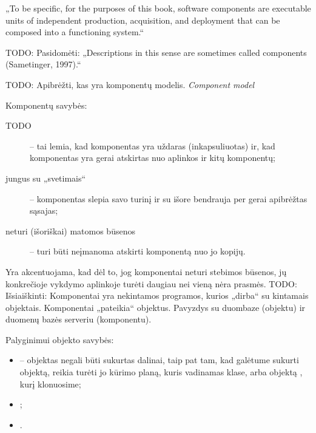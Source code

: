 „To be specific, for the purposes of this book, software components
are executable units of independent production, acquisition, and deployment
that can be composed into a functioning system.“ 
\cite[3]{cs-beyond-object-oriented-programming}

TODO: Pasidomėti: „Descriptions in this sense are sometimes called
components (Sametinger, 1997).“%
\cite[3]{cs-beyond-object-oriented-programming}

TODO: Apibrėžti, kas yra komponentų modelis. \emph{Component model}

Komponentų savybės\cite[36]{cs-beyond-object-oriented-programming}:
\begin{description}
  \item[TODO] 
    – tai lemia, kad komponentas yra uždaras (inkapsuliuotas) ir, kad
    komponentas yra gerai atskirtas nuo aplinkos ir kitų komponentų;
  \item[jungus su „svetimais“] 
    – komponentas slepia savo turinį ir su išore bendrauja per gerai
    apibrėžtas sąsajas;
  \item[neturi (išoriškai) matomos būsenos]  – turi būti neįmanoma atskirti komponentą
    nuo jo kopijų.
\end{description}
Yra akcentuojama, kad dėl to, jog komponentai neturi stebimos būsenos,
jų konkrečioje vykdymo aplinkoje turėti daugiau nei vieną nėra prasmės.
TODO: Išsiaiškinti\cite[37]{cs-beyond-object-oriented-programming}:
Komponentai yra nekintamos programos, kurios „dirba“ su kintamais
objektais. Komponentai „pateikia“ objektus. 
Pavyzdys su duombaze (objektu) ir duomenų bazės serveriu (komponentu).

Palyginimui objekto savybės\cite[36]{cs-beyond-object-oriented-programming}:
\begin{itemize}
  \item {}
    – objektas negali būti sukurtas dalinai, taip pat tam, kad galėtume
    sukurti objektą, reikia turėti jo kūrimo planą, kuris vadinamas klase,
    arba objektą , kurį klonuosime;
  \item {};
  \item {}.
\end{itemize}


